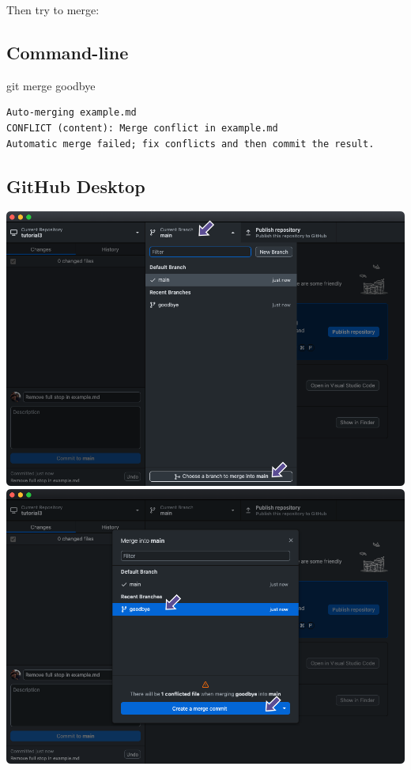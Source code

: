 \documentclass[
  letterpaper,
  DIV=11,
  numbers=noendperiod]{scrartcl}
\newenvironment{Shaded}{\begin{snugshade}}{\end{snugshade}}
\newcommand{\NormalTok}[1]{\textcolor[rgb]{0.00,0.23,0.31}{#1}}
\begin{document}
Then try to merge:

\subsection{Command-line}

\begin{Shaded}
\begin{Highlighting}[]
\NormalTok{git merge goodbye}
\end{Highlighting}
\end{Shaded}

\begin{verbatim}
Auto-merging example.md
CONFLICT (content): Merge conflict in example.md
Automatic merge failed; fix conflicts and then commit the result.
\end{verbatim}

\subsection{GitHub Desktop}

\includegraphics{images/image62.png}
\includegraphics{images/image63.png}
\end{document}
